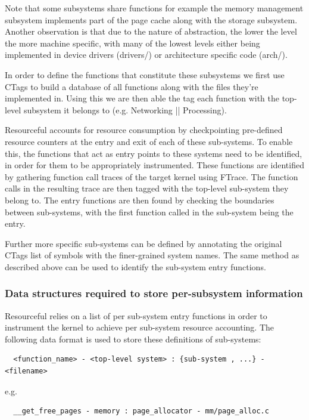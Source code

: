 \documentclass[12pt]{article}
\begin{document}
  Note that some subsystems share functions for example the memory management subsystem implements part of the page cache along with the storage subsystem.
  Another observation is that due to the nature of abstraction, the lower the level the more machine specific, with many of the lowest levels either being implemented in device drivers (drivers/) or architecture specific code (arch/).


  In order to define the functions that constitute these subsystems we first use CTags to build a database of all functions along with the files they’re implemented in.
  Using this we are then able the tag each function with the top-level subsystem it belongs to (e.g. Networking || Processing).


  Resourceful accounts for resource consumption by checkpointing pre-defined resource counters at the entry and exit of each of these sub-systems.
  To enable this, the functions that act as entry points to these systems need to be identified, in order for them to be appropriately instrumented.
  These functions are identified by gathering function call traces of the target kernel using FTrace.
  The function calls in the resulting trace are then tagged with the top-level sub-system they belong to.
  The entry functions are then found by checking the boundaries between sub-systems, with the first function called in the sub-system being the entry.


  Further more specific sub-systems can be defined by annotating the original CTags list of symbols with the finer-grained system names. The same method as described above can be used to identify the sub-system entry functions.

  \subsubsection{Data structures required to store per-subsystem information}
  Resourceful relies on a list of per sub-system entry functions in order to instrument the kernel to achieve per sub-system resource accounting. The following data format is used to store these definitions of sub-systems:

  \begin{lstlisting}
  <function_name> - <top-level system> : {sub-system , ...} - <filename>
  \end{lstlisting}

  e.g.
  \begin{lstlisting}
  __get_free_pages - memory : page_allocator - mm/page_alloc.c
  \end{lstlisting}
\end{document}
